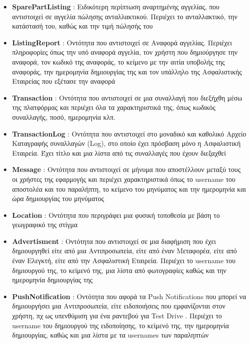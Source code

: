 \documentclass{../ol-softwaremanual}
\begin{document}
\begin{itemize}
		\item \en \textbf{SparePartListing} \gr : Ειδικότερη περίπτωση αναρτημένης αγγελίας, που αντιστοιχεί σε αγγελία πώλησης ανταλλακτικού. Περιέχει το ανταλλακτικό, την κατάστασή του, καθώς και την τιμή πώλησής του
		\item \en \textbf{ListingReport} \gr : Οντότητα που αντιστοιχεί σε Αναφορά αγγελίας. Περιέχει πληροφορίες όπως την υπό αναφορά αγγελία, τον χρήστη που δημιούργησε την αναφορά, τον κωδικό της αναφοράς, το κείμενο με την αιτία υποβολής της αναφοράς, την ημερομηνία δημιουργίας της και τον υπάλληλο της Ασφαλιστικής Εταιρείας που εξέτασε την αναφορά
		\item \en \textbf{Transaction} \gr : Οντότητα που αντιστοιχεί σε μια συναλλαγή που διεξήχθη μέσω της πλατφόρμας και περιέχει όλα τα χαρακτηριστικά της, όπως κωδικός συναλλαγής, ποσό, ημερομηνία κλπ.
		\item \en \textbf{TransactionLog} \gr : Οντότητα που αντιστοιχεί στο μοναδικό και καθολικό Αρχείο Καταγραφής συναλλαγών (\en Log\gr), στο οποίο έχει πρόσβαση μόνο η Ασφαλιστική Εταιρεία. Έχει τίτλο και μια λίστα από τις συναλλαγές που έχουν διεξαχθεί
		\item \en \textbf{Message} \gr : Οντότητα που αντιστοιχεί σε μήνυμα που αποστέλλουν μεταξύ τους οι χρήστες της εφαρμογής και περιέχει χαρακτηριστικά όπως το \en username \gr του αποστολέα και του παραλήπτη, το κείμενο του μηνύματος και την ημερομηνία και ώρα δημιουργίας του μηνύματος
		\item \en \textbf{Location} \gr : Οντότητα που περιγράφει μια φυσική τοποθεσία με βάση το γεωγραφικό της στίγμα
		\item \en \textbf{Advertisment} \gr : Οντότητα που αντιστοιχεί σε μια διαφήμιση που έχει δημιουργηθεί είτε από μια Αντιπροσωπεία, είτε από έναν Μεταφορέα, είτε από έναν Ελεγκτή, είτε από την Ασφαλιστική Εταιρεία. Περιέχει το \en username \gr του δημιουργού της, το κείμενό της, μια λίστα από φωτογραφίες καθώς και την ημερομηνία δημιουργίας της
		\item \en \textbf{PushNotification} \gr : Οντότητα που αφορά τα \en Push Notifications \gr που μπορεί να δημιουργήσει μια Αντιπροσωπεία, είτε ειδοποιήσεις που εμφανίζονται στον χρήστη, πχ ως υπενθύμιση για ένα ραντεβού για \en Test Drive \gr. Περιέχει το \en username \gr του δημιουργού της ειδοποίησης, το κείμενό της, την ημερομηνία δημιουργίας, καθώς και μια λίστα με τα \en usernames \gr των παραληπτών

\end{itemize}
\end{document}
